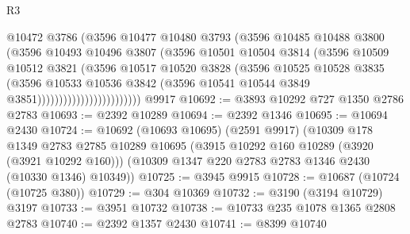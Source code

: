 \begin{lexlean}{R3}
\begin{coremodule}
                                  @10472
                                  @3786
                                  (@3596
                                    @10477
                                    @10480
                                    @3793
                                    (@3596
                                      @10485
                                      @10488
                                      @3800
                                      (@3596
                                        @10493
                                        @10496
                                        @3807
                                        (@3596
                                          @10501
                                          @10504
                                          @3814
                                          (@3596
                                            @10509
                                            @10512
                                            @3821
                                            (@3596
                                              @10517
                                              @10520
                                              @3828
                                              (@3596
                                                @10525
                                                @10528
                                                @3835
                                                (@3596
                                                  @10533
                                                  @10536
                                                  @3842
                                                  (@3596
                                                    @10541
                                                    @10544
                                                    @3849
                                                    @3851))))))))))))))))))))))))
    @9917
@10692 := @3893 @10292 @727 @1350 @2786 @2783
@10693 := @2392 @10289
@10694 := @2392 @1346
@10695 := @10694 @2430
@10724 := @10692
    (@10693 @10695)
    (@2591 @9917)
    (@10309
      @178
      @1349
      @2783
      @2785
      @10289
      @10695
      (@3915 @10292 @160 @10289 (@3920 (@3921 @10292 @160)))
      (@10309 @1347 @220 @2783 @2783 @1346 @2430 (@10330 @1346) @10349))
@10725 := @3945 @9915
@10728 := @10687 (@10724 (@10725 @380))
@10729 := @304 @10369
@10732 := @3190 (@3194 @10729) @3197
@10733 := @3951 @10732
@10738 := @10733 @235 @1078 @1365 @2808 @2783
@10740 := @2392 @1357 @2430
@10741 := @8399 @10740

\end{coremodule}
\end{lexlean}
